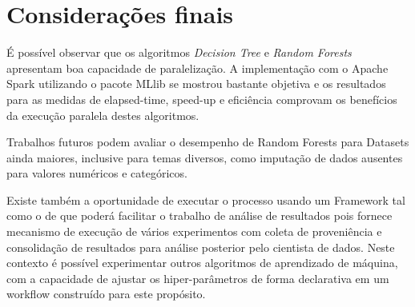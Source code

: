 \documentclass[12pt]{article}
\begin{document}
\section{Considerações finais}
\label{sec:Considerações finais}

É possível observar que os algoritmos {\it Decision Tree} e {\it Random Forests} apresentam boa capacidade de paralelização. A implementação com o Apache Spark utilizando o pacote MLlib se mostrou bastante objetiva e os resultados para as medidas de elapsed-time, speed-up e eficiência comprovam os benefícios da execução paralela destes algoritmos.

Trabalhos futuros podem avaliar o desempenho de Random Forests para Datasets ainda maiores, inclusive para temas diversos, como imputação de dados ausentes para valores numéricos e categóricos.

Existe também a oportunidade de executar o processo usando um Framework tal como o de \cite{ferreira2017} que poderá facilitar o trabalho de análise de resultados pois fornece mecanismo de execução de vários experimentos com coleta de proveniência e consolidação de resultados para análise posterior pelo cientista de dados. Neste contexto é possível experimentar outros algoritmos de aprendizado de máquina, com a capacidade de ajustar os hiper-parâmetros de forma declarativa em um workflow construído para este propósito.



\end{document}
